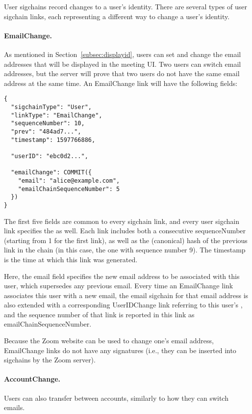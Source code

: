 User sigchains record changes to a user’s identity. There are several types of user sigchain links,
each representing a different way to change a user's identity.

\paragraph{EmailChange.} As mentioned in Section~\ref{subsec:displayid}, users can set and change the
email addresses that will be displayed in the meeting UI\@. Two users can switch email addresses,
but the server will prove that two users do not have the same email address at the same time. An
\textsf{EmailChange} link will have the following fields:

\begingroup{}
\fontsize{10pt}{12pt}\selectfont{}
\begin{verbatim}
{
  "sigchainType": "User",
  "linkType": "EmailChange",
  "sequenceNumber": 10,
  "prev": "484ad7...",
  "timestamp": 1597766886,

  "userID": "ebc0d2...",

  "emailChange": COMMIT({
    "email": "alice@example.com",
    "emailChainSequenceNumber": 5
  })
}
\end{verbatim}
\endgroup{}

The first five fields are common to every sigchain link, and every user sigchain link specifies the
\userID as well. Each link includes both a consecutive \textsf{sequenceNumber} (starting from 1 for
the first link), as well as the (canonical) hash of the previous link in the chain (in this case,
the one with sequence number 9). The timestamp is the time at which this link was generated.

Here, the \textsf{email} field specifies the new email address to be associated with this user,
which supersedes any previous email. Every time an \textsf{EmailChange} link associates this user
with a new email, the email sigchain for that email address is also extended with a corresponding
\textsf{UserIDChange} link referring to this user’s \userID, and the sequence number of that link is
reported in this link as \textsf{emailChainSequenceNumber}.

Because the Zoom website can be used to change one's email address, \textsf{EmailChange} links do
not have any signatures (i.e., they can be inserted into sigchains by the Zoom server).

\paragraph{AccountChange.} Users can also transfer between accounts, similarly to how they can
switch emails.

